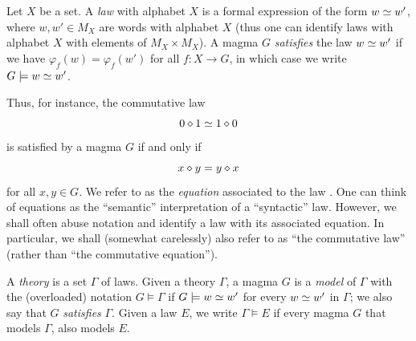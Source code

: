 \begin{definition}[Law]\label{law-def}
  \leanok
  Let $X$ be a set. A \emph{law} with alphabet $X$ is a formal expression of the form $w \simeq w'$,
  where $w, w' \in M_X$ are words with alphabet $X$ (thus one can identify laws with alphabet $X$
  with elements of $M_X \times M_X$).
  A magma $G$ \emph{satisfies} the law $w \simeq w'$ if
  we have $\varphi_f( w ) = \varphi_f ( w' )$ for all $f: X \to G$, in which case we write
  $G \models w \simeq w'$.
\end{definition}

Thus, for instance, the commutative law
\begin{equation}\label{comm-law}
  0 \diamond 1 \simeq 1 \diamond 0
\end{equation}
is satisfied by a magma $G$ if and only if
\begin{equation}\label{comm-law-2}
 x \diamond y = y \diamond x
\end{equation}
for all $x, y \in G$. We refer to  as the \emph{equation} associated to the law . One can think of equations as the ``semantic'' interpretation of a ``syntactic'' law. However, we shall often abuse notation and identify a law with its associated equation. In particular, we shall (somewhat carelessly) also refer to  as ``the commutative law'' (rather than ``the commutative equation'').

\begin{definition}[Models]\label{models-def}
  \leanok
  A \emph{theory} is a set $\Gamma$ of laws.
  Given a theory $\Gamma$, a magma $G$ is a \emph{model} of $\Gamma$ with the
  (overloaded) notation $G\models\Gamma$ if $G\models w\simeq w'$ for every $w\simeq w'$ in $\Gamma$; we also say that $G$ \emph{satisfies} $\Gamma$.
  Given a law $E$, we write $\Gamma \models E$ if every magma $G$ that models $\Gamma$, also models $E$.
\end{definition}

